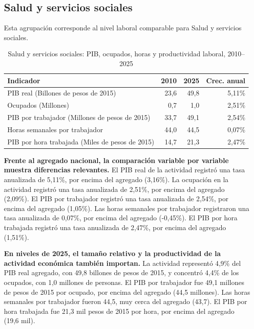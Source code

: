 \subsection{Salud y servicios sociales}

Esta agrupación corresponde al nivel laboral comparable para Salud y servicios sociales.

\begin{table}[H]
\centering
\caption{Salud y servicios sociales: PIB, ocupados, horas y productividad laboral, 2010--2025}
\label{tab:agg25_q_productividad}
\small
\begin{tabular}{lrrr}
\toprule
Indicador & 2010 & 2025 & Crec. anual \\
\midrule
PIB real  (Billones de pesos de 2015) & 23,6 & 49,8 & 5,11\% \\
Ocupados (Millones) & 0,7 & 1,0 & 2,51\% \\
PIB por trabajador (Millones de pesos de 2015) & 33,7 & 49,1 & 2,54\% \\
Horas semanales por trabajador & 44,0 & 44,5 & 0,07\% \\
PIB por hora trabajada (Miles de pesos de 2015) & 14,7 & 21,3 & 2,47\% \\
\bottomrule
\end{tabular}
\end{table}

\textbf{Frente al agregado nacional, la comparación variable por variable muestra diferencias relevantes.} El PIB real de la actividad registró una tasa anualizada de 5,11\%, por encima del agregado (3,16\%). La ocupación en la actividad registró una tasa anualizada de 2,51\%, por encima del agregado (2,09\%). El PIB por trabajador registró una tasa anualizada de 2,54\%, por encima del agregado (1,05\%). Las horas semanales por trabajador registraron una tasa anualizada de 0,07\%, por encima del agregado (-0,45\%). El PIB por hora trabajada registró una tasa anualizada de 2,47\%, por encima del agregado (1,51\%).

\textbf{En niveles de 2025, el tamaño relativo y la productividad de la actividad económica también importan.} La actividad representó 4,9\% del PIB real agregado, con 49,8 billones de pesos de 2015, y concentró 4,4\% de los ocupados, con 1,0 millones de personas. El PIB por trabajador fue 49,1 millones de pesos de 2015 por ocupado, por encima del agregado (44,5 millones). Las horas semanales por trabajador fueron 44,5, muy cerca del agregado (43,7). El PIB por hora trabajada fue 21,3 mil pesos de 2015 por hora, por encima del agregado (19,6 mil).


